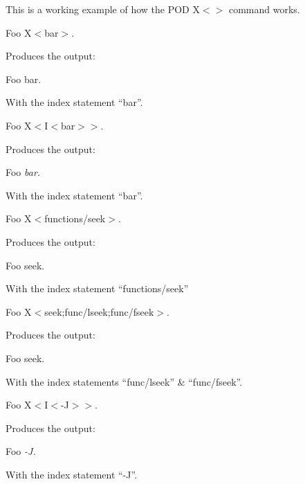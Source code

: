 \documentclass[10pt,letterpaper,oneside,onecolumn]{report}
\begin{document}
\noindent This
is
a
working
example
of
how
the
POD
\ttfamily X\(<\)\(>\)
\rmfamily command
works.

\begin{lyxcode}
Foo
X\(<\)bar\(>\).


\end{lyxcode}
Produces
the
output:

\begin{lyxcode}
Foo
bar.


\end{lyxcode}
With
the
index
statement
``bar''.
\lyxline{\normalsize}

\begin{lyxcode}
Foo
X\(<\)I\(<\)bar\(>\)\(>\).

\end{lyxcode}
Produces
the
output:

\begin{lyxcode}
Foo
\em bar\em .

\end{lyxcode}
\noindent With
the
index
statement
``bar''.
\lyxline{\normalsize}

\begin{lyxcode}
Foo
X\(<\)functions/seek\(>\).

\end{lyxcode}
Produces
the
output:

\begin{lyxcode}
Foo
seek.

\end{lyxcode}
With
the
index
statement
``functions/seek''
\lyxline{\normalsize}

\begin{lyxcode}
Foo
X\(<\)seek;func/lseek;func/fseek\(>\).

\end{lyxcode}
Produces
the
output:

\begin{lyxcode}
Foo
seek.

\end{lyxcode}
With
the
index
statements
``func/lseek''
\&
``func/fseek''.
\lyxline{\normalsize}

\begin{lyxcode}
Foo
X\(<\)I\(<\)-J\(>\)\(>\).

\end{lyxcode}
Produces
the
output:

\begin{lyxcode}
Foo
\em -J\em .

\end{lyxcode}
With
the
index
statement
``-J''.
\lyxline{\normalsize}
\end{document}
